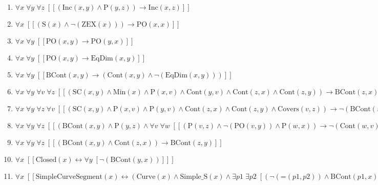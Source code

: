 \documentclass{article}
\begin{document}
\begin{enumerate}
\item $\forall x\; \forall y\; \forall z\;  \left[ \left[ \left(\textrm{Inc}(x,y) \land \textrm{P}(y,z)\right) \rightarrow \textrm{Inc}(x,z) \right] \right]$
\item $\forall x\;  \left[ \left[ \left(\textrm{S}(x) \land \neg \left(\textrm{ZEX}(x)\right)\right) \rightarrow \textrm{PO}(x,x) \right] \right]$
\item $\forall x\; \forall y\;  \left[ \left[ \textrm{PO}(x,y) \rightarrow \textrm{PO}(y,x) \right] \right]$
\item $\forall x\; \forall y\;  \left[ \left[ \textrm{PO}(x,y) \rightarrow \textrm{EqDim}(x,y) \right] \right]$
\item $\forall x\; \forall y\;  \left[ \left[ \textrm{BCont}(x,y) \rightarrow \left(\textrm{Cont}(x,y) \land \neg \left(\textrm{EqDim}(x,y)\right)\right) \right] \right]$
\item $\forall x\; \forall y\; \forall v\; \forall z\;  \left[ \left[ \left(\textrm{SC}(x,y) \land \textrm{Min}(x) \land \textrm{P}(x,v) \land \textrm{Cont}(y,v) \land \textrm{Cont}(z,x) \land \textrm{Cont}(z,y)\right) \rightarrow \textrm{BCont}(z,x) \right] \right]$
\item $\forall x\; \forall y\; \forall z\; \forall v\;  \left[ \left[ \left(\textrm{SC}(x,y) \land \textrm{P}(x,v) \land \textrm{P}(y,v) \land \textrm{Cont}(z,x) \land \textrm{Cont}(z,y) \land \textrm{Covers}(v,z)\right) \rightarrow \neg \left(\textrm{BCont}(z,v)\right) \right] \right]$
\item $\forall x\; \forall y\; \forall z\;  \left[ \left[ \left(\textrm{BCont}(x,y) \land \textrm{P}(y,z) \land \forall v\; \forall w\;  \left[ \left[ \left(\textrm{P}(v,z) \land \neg \left(\textrm{PO}(v,y)\right) \land \textrm{P}(w,x)\right) \rightarrow \neg \left(\textrm{Cont}(w,v)\right) \right] \right]\right) \rightarrow \textrm{BCont}(x,z) \right] \right]$
\item $\forall x\; \forall y\; \forall z\;  \left[ \left[ \left(\textrm{BCont}(x,y) \land \textrm{Cont}(z,x)\right) \rightarrow \textrm{BCont}(z,y) \right] \right]$
\item $\forall x\;  \left[ \left[ \textrm{Closed}(x) \leftrightarrow \forall y\;  \left[ \neg \left(\textrm{BCont}(y,x)\right) \right] \right] \right]$
\item $\forall x\;  \left[ \left[ \textrm{SimpleCurveSegment}(x) \leftrightarrow \left(\textrm{Curve}(x) \land \textrm{Simple\_S}(x) \land \exists p1\; \exists p2\;  \left[ \left(\neg \left(\textrm{=}(p1,p2)\right) \land \textrm{BCont}(p1,x) \land \textrm{BCont}(p2,x)\right) \right]\right) \right] \right]$

\end{enumerate}
\end{document}

